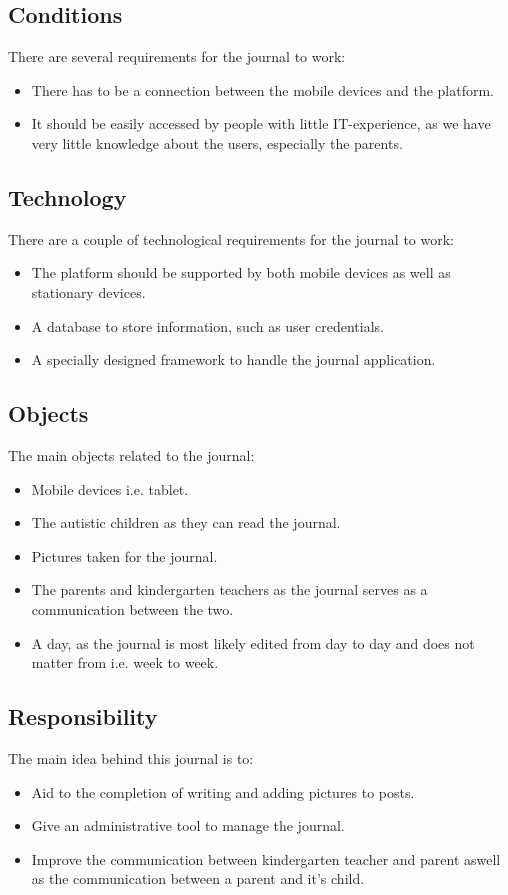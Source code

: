 \subsection{Conditions}
There are several requirements for the journal to work:
\begin{itemize}
	\item{There has to be a connection between the mobile devices and the platform.}
	\item{It should be easily accessed by people with little IT-experience, as we have very little knowledge about the users, especially the parents.}
\end{itemize}

\subsection{Technology}
There are a couple of technological requirements for the journal to work:
\begin{itemize}
	\item{The platform should be supported by both mobile devices as well as stationary devices.}
	\item{A database to store information, such as user credentials.}
  	\item{A specially designed framework to handle the journal application.}
	\end{itemize}

\subsection{Objects}
The main objects related to the journal:
\begin{itemize}
	\item{Mobile devices i.e. tablet.}
	\item{The autistic children as they can read the journal.}
	\item{Pictures taken for the journal.}
	\item{The parents and kindergarten teachers as the journal serves as a communication between the two.}
	\item{A day, as the journal is most likely edited from day to day and does not matter from i.e. week to week.}
\end{itemize}

\subsection{Responsibility} 
The main idea behind this journal is to:
\begin{itemize}
	\item{Aid to the completion of writing and adding pictures to posts.}
	\item{Give an administrative tool to manage the journal.}
	\item{Improve the communication between kindergarten teacher and parent aswell as the communication between a parent and it's child.}
\end{itemize}

